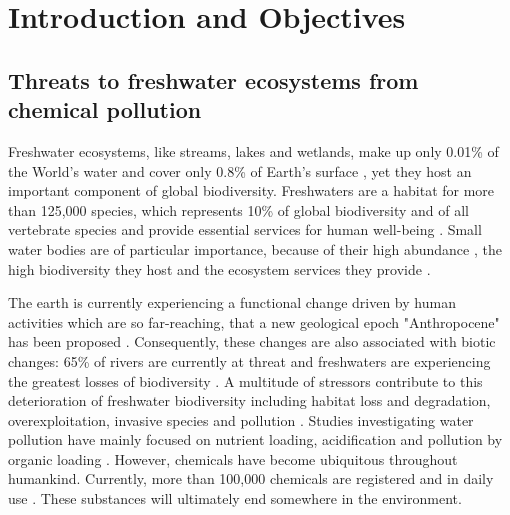 
\chapter{Introduction and Objectives}
\label{sec:introduction} 

\section{Threats to freshwater ecosystems from chemical pollution}

Freshwater ecosystems, like streams, lakes and wetlands, make up only 0.01\% of the World's water and cover only 0.8\% of Earth's surface \citep{dudgeon_freshwater_2006}, yet they host an important component of global biodiversity. 
Freshwaters are a habitat for more than 125,000 species, which represents 10\% of global biodiversity and  of all vertebrate species \citep{balian_freshwater_2007,  strayer_freshwater_2010} and provide essential services for human well-being \citep{aylward_freshwater_2005}. 
Small water bodies are of particular importance, because of their high abundance \citep{downing_global_2012}, the high biodiversity they host \citep{davies_comparative_2008} and the ecosystem services they provide \citep{biggs_importance_2016}. 

The earth is currently experiencing a functional change driven by human activities which are so far-reaching, that a new geological epoch "Anthropocene" has been proposed \citep{waters_anthropocene_2016}. 
Consequently, these changes are also associated with biotic changes: 65\% of rivers are currently at threat \citep{vorosmarty_global_2010} and freshwaters are experiencing the greatest losses of biodiversity \citep{wwf_living_2016}. 
A multitude of stressors contribute to this deterioration of freshwater biodiversity including habitat loss and degradation, overexploitation, invasive species and pollution \citep{dudgeon_freshwater_2006, vorosmarty_global_2010, wwf_living_2016}. 
Studies investigating water pollution have mainly focused on nutrient loading, acidification and pollution by organic loading \citep{schafer_contribution_2016}. 
However, chemicals have become ubiquitous throughout humankind. 
Currently, more than 100,000 chemicals are registered and in daily use \citep{schwarzman_new_2009, schwarzenbach_global_2010}. 
These substances will ultimately end somewhere in the environment.

